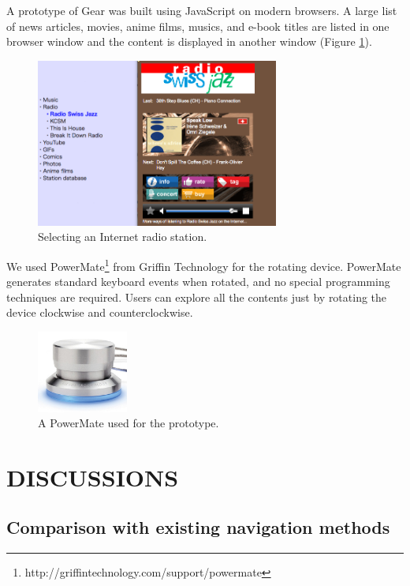 \documentclass{article}
\begin{document}
A prototype of Gear was built using JavaScript on modern browsers.
A large list of news articles, movies, anime films, musics, and e-book titles are listed in one browser window
and the content is displayed in another window (Figure \ref{screenshot}).

\begin{figure}[H]
\centerline{\includegraphics[width=80mm,bb=0 0 671 464]{figures/95cf2fec71c52ead6fdbcb7f79aca654.png}}
\caption{Selecting an Internet radio station.}
\label{screenshot}
\end{figure}

We used
PowerMate\footnote{
  \textsf{http://griffintechnology.com/support/powermate}
} from Griffin Technology for the rotating device.
PowerMate generates standard keyboard events when rotated,
and no special programming techniques are required.
%
Users can explore all the contents just by
rotating the device clockwise and counterclockwise.

\begin{figure}[H]
\centerline{\includegraphics[width=30mm,bb=0 0 389 348]{figures/d3a69499f7e7314ae6dc10f5bf3a2be5.png}}
\caption{A PowerMate used for the prototype.}
\label{powermate}
\end{figure}

\section*{DISCUSSIONS}

\subsection{Comparison with existing navigation methods}
\end{document}
